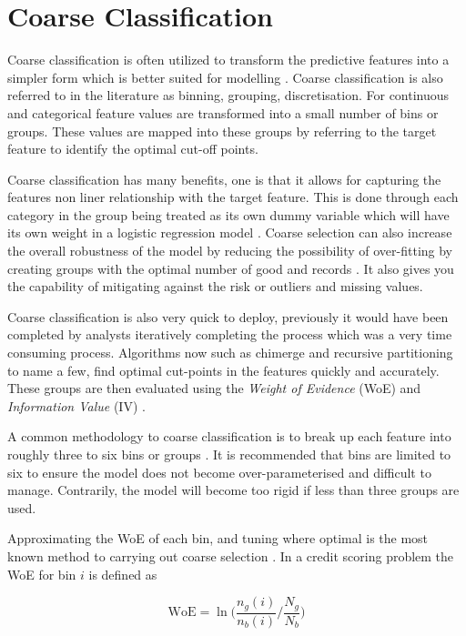 \section{Coarse Classification} \label{sec:binning}
Coarse classification is often utilized to transform the predictive features into a simpler form which is better suited for modelling \citep{carroll_transformation_1988}. Coarse classification is also referred to in the literature as binning, grouping, discretisation. For continuous and categorical feature values are transformed into a small number of bins or groups. These values  are mapped into these groups by referring to the target feature to identify the optimal cut-off points. 

Coarse classification has many benefits, one is that it allows for capturing the features non liner relationship with the target feature. This is done through each category in the group being treated as its own dummy variable which will have its own weight in a logistic regression model \citep{hand_optimal_2005}. Coarse selection can also increase the overall robustness of the model by reducing the possibility of over-fitting by creating groups with the optimal number of good and records \citep{baesens_50_2009}. It also gives you the capability of mitigating against the risk or outliers and missing values. 

Coarse classification is also very quick to deploy, previously it would have been completed by analysts iteratively completing the process which was a very time consuming process. Algorithms now such as chimerge and recursive partitioning to name a few, find optimal cut-points in the features quickly and accurately. These groups are then evaluated using the \textit{Weight of Evidence} (WoE) and \textit{Information Value} (IV) \citep{garcia_survey_2013}. 

A common methodology to coarse classification is to break up each feature into roughly three to six bins or groups \citep{hand_optimal_2005}. It is recommended that bins are limited to six to ensure the model does not become over-parameterised and difficult to manage. Contrarily, the model will become too rigid if less than three groups are used. 

Approximating the WoE of each bin, and tuning where optimal is the most known method to carrying out coarse selection \citep{thomas_consumer_2009}. In a credit scoring problem the WoE for bin $i$ is defined as 
  
\begin{equation} \label{eq:woe}
\text{WoE} =  \ln\bigg(\frac{n_g(i)}{n_b(i)} \bigg/ \frac{N_g}{N_b}\bigg)
\end{equation}

